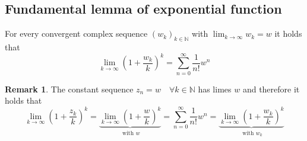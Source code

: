 \documentclass[a4paper,landscape,twocolumn]{article}
\theoremstyle{definition}
\newtheorem{rem}{Remark}
\begin{document}
\subsection{Fundamental lemma of exponential function}
%
For every convergent complex sequence $(w_k)_{k\in\mathbb N}$
with $\lim_{k\to\infty} w_k = w$ it holds that
\[
  \lim_{k\to\infty} \left(1 + \frac{w_k}{k}\right)^k
  = \sum_{n=0}^\infty \frac1{n!} w^n
\]
\begin{rem}
  The constant sequence $z_n = w \quad\forall k \in \mathbb N$ has
  limes $w$ and therefore it holds that
  \[
    \lim_{k\to\infty} \left(1 + \frac{z_k}{k}\right)^k
    = \underbrace{\lim_{k\to\infty} \left(1 + \frac wk\right)^k}_{\text{ with } w}
    = \sum_{n=0}^\infty \frac1{n!} w^n
    = \underbrace{\lim_{k\to\infty} \left(1 + \frac{w_k}{k}\right)^k}_{\text{ with } w_k}
  \]
\end{rem}
\end{document}
